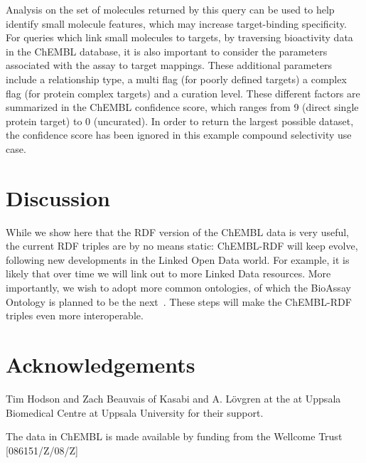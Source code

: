 \documentclass[sw]{iosart2c}
\begin{document}
Analysis on the set of molecules returned by this query can be used to help identify small 
molecule features, which may increase target-binding specificity. For queries which link 
small molecules to targets, by traversing bioactivity data in the ChEMBL database, it is 
also important to consider the parameters associated with the assay to target mappings. 
These additional parameters include a relationship type, a multi flag (for poorly defined
targets) a complex flag (for protein complex targets) and a curation level. These different 
factors are summarized in the ChEMBL confidence score, which ranges from 9 (direct single 
protein target) to 0 (uncurated). In order to return the largest possible dataset, the 
confidence score has been ignored in this example compound selectivity use case.

\section{Discussion}

While we show here that the RDF version of the ChEMBL data is very useful, the current RDF triples are by no means static: ChEMBL-RDF
will keep evolve, following new developments in the Linked Open Data world. For example, it is likely that over time we will link out
to more Linked Data resources. More importantly, we wish to adopt more common ontologies, of which the BioAssay Ontology is planned
to be the next~\cite{Visser2011}. These steps will make the ChEMBL-RDF triples even more interoperable.

\section{Acknowledgements}

Tim Hodson and Zach Beauvais of Kasabi and A. L\"ovgren at the at Uppsala Biomedical Centre at Uppsala University for their
support.

The data in ChEMBL is made available by funding from the Wellcome Trust [086151/Z/08/Z]



%
%
%
\end{document}
